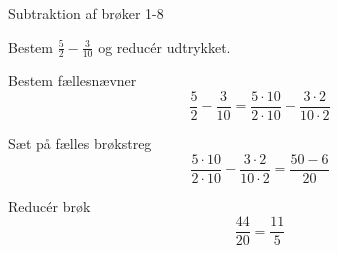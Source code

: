 \documentclass{article}
\begin{document}
\newpage

\begin{exercise}{Subtraktion af brøker 1-8}

Bestem $\frac{5}{2} - \frac{3}{10}$ og reducér udtrykket.


\hint

Bestem fællesnævner
\[
\frac{5}{2} - \frac{3}{10} = \frac{5 \cdot 10}{2 \cdot 10} - \frac{3 \cdot 2}{10 \cdot 2}
\]

\hint

Sæt på fælles brøkstreg
\[
\frac{5 \cdot 10}{2 \cdot 10} - \frac{3 \cdot 2}{10 \cdot 2} = \frac{50 - 6}{20}
\]

\hint

Reducér brøk
\[
\frac{44}{20} = \frac{11}{5}
\]

\end{exercise}
\end{document}
